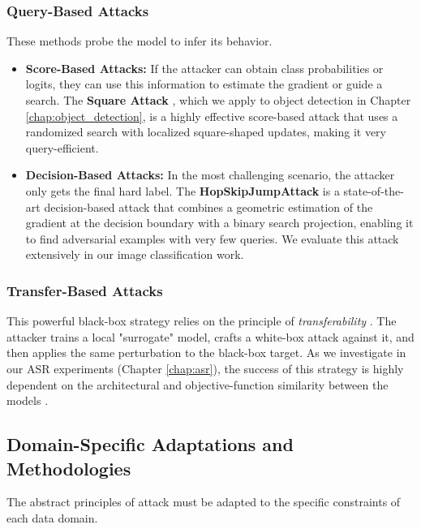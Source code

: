 \documentclass[../main.tex]{subfiles}
\begin{document}
\subsubsection{Query-Based Attacks}
These methods probe the model to infer its behavior.
\begin{itemize}
    \item \textbf{Score-Based Attacks:} If the attacker can obtain class probabilities or logits, they can use this information to estimate the gradient or guide a search. The \textbf{Square Attack} \cite{andriushchenko2020square}, which we apply to object detection in Chapter \ref{chap:object_detection}, is a highly effective score-based attack that uses a randomized search with localized square-shaped updates, making it very query-efficient.
    \item \textbf{Decision-Based Attacks:} In the most challenging scenario, the attacker only gets the final hard label. The \textbf{HopSkipJumpAttack} \cite{chen2020hopskipjumpattackqueryefficientdecisionbasedattack} is a state-of-the-art decision-based attack that combines a geometric estimation of the gradient at the decision boundary with a binary search projection, enabling it to find adversarial examples with very few queries. We evaluate this attack extensively in our image classification work.
\end{itemize}

\subsubsection{Transfer-Based Attacks}
This powerful black-box strategy relies on the principle of \textit{transferability} \cite{cross_model_transfer}. The attacker trains a local "surrogate" model, crafts a white-box attack against it, and then applies the same perturbation to the black-box target. As we investigate in our ASR experiments (Chapter \ref{chap:asr}), the success of this strategy is highly dependent on the architectural and objective-function similarity between the models \cite{olivier2023transferable, gao2024transferable}.

\subsection{Domain-Specific Adaptations and Methodologies}
The abstract principles of attack must be adapted to the specific constraints of each data domain.
\end{document}
